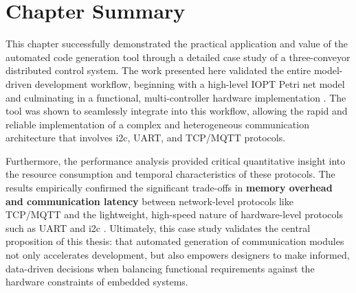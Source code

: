 
\section{Chapter Summary}
\label{sec:case_study_summary}

This chapter successfully demonstrated the practical application and value of the automated code generation tool through a detailed case study of a three-conveyor distributed control system. The work presented here validated the entire model-driven development workflow, beginning with a high-level IOPT Petri net model and culminating in a functional, multi-controller hardware implementation . The tool was shown to seamlessly integrate into this workflow, allowing the rapid and reliable implementation of a complex and heterogeneous communication architecture that involves \gls{i2c}, UART, and TCP/MQTT protocols.

Furthermore, the performance analysis provided critical quantitative insight into the resource consumption and temporal characteristics of these protocols. The results empirically confirmed the significant trade-offs in \textbf{memory overhead and communication latency} between network-level protocols like TCP/MQTT and the lightweight, high-speed nature of hardware-level protocols such as UART and \gls{i2c} . Ultimately, this case study validates the central proposition of this thesis: that automated generation of communication modules not only accelerates development, but also empowers designers to make informed, data-driven decisions when balancing functional requirements against the hardware constraints of embedded systems.